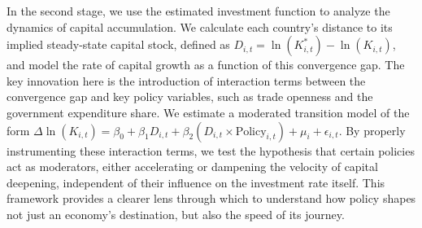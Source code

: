 \documentclass[]{article}
\begin{document}
In the second stage, we use the estimated investment function to analyze the dynamics of capital accumulation. We calculate each country's distance to its implied steady-state capital stock, defined as $D_{i,t} = \ln(K^*_{i,t}) - \ln(K_{i,t})$, and model the rate of capital growth as a function of this convergence gap. The key innovation here is the introduction of interaction terms between the convergence gap and key policy variables, such as trade openness and the government expenditure share. We estimate a moderated transition model of the form $\Delta \ln(K_{i,t}) = \beta_0 + \beta_1 D_{i,t} + \beta_2 (D_{i,t} \times \text{Policy}_{i,t}) + \mu_i + \epsilon_{i,t}$. By properly instrumenting these interaction terms, we test the hypothesis that certain policies act as moderators, either accelerating or dampening the velocity of capital deepening, independent of their influence on the investment rate itself. This framework provides a clearer lens through which to understand how policy shapes not just an economy's destination, but also the speed of its journey.
\end{document}
